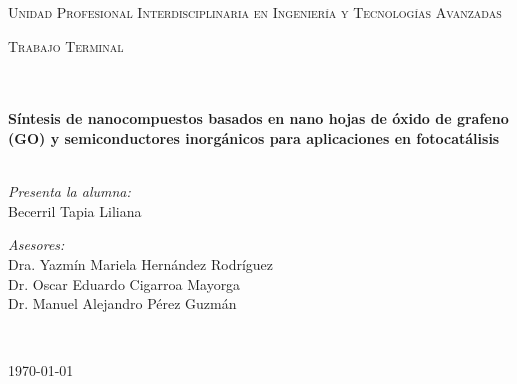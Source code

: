 \documentclass[12pt]{article}
\begin{document}
\begin{center}
\textsc{\LARGE Unidad Profesional Interdisciplinaria en Ingenier\'ia y				%
Tecnolog\'ias Avanzadas}\\[1.5cm]													%

\begin{minipage}{0.9\textwidth} 
\begin{center}																					%
\textsc{\LARGE Trabajo Terminal}
\end{center}
\end{minipage}\\[0.5cm]
 			\vspace*{1cm}																		%
\HRule \\[0.4cm]																	%
{ \huge \bfseries Síntesis de nanocompuestos basados en nano hojas de óxido de grafeno (GO) y semiconductores inorgánicos para aplicaciones en fotocatálisis}\\[0.4cm]	%
\HRule \\[1.5cm]																	%
\begin{minipage}{0.46\textwidth}													%
\begin{flushleft} \large															%
\emph{Presenta la alumna:}\\	
Becerril Tapia Liliana
\end{flushleft}																		%
\end{minipage}		
\begin{minipage}{0.52\textwidth}		
\vspace{-0.7cm}											%
\begin{flushright} \large															%
\emph{Asesores:} \\																	%
Dra. Yazmín Mariela Hernández Rodríguez\\
Dr. Oscar Eduardo Cigarroa Mayorga\\
Dr. Manuel Alejandro Pérez Guzmán													%
\end{flushright}																	%
\end{minipage}	
\vspace*{0.5cm}
 	
 		\\																		%
\vspace{0.5cm} 																				
\begin{center}																					
{\large \today}																	%
 			\end{center}												  						
\end{center}							 											
																					
\end{document}
